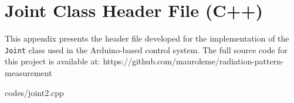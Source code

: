 \chapter{Joint Class Header File (C++)}
\label{apendice3}

This appendix presents the header file developed for the implementation of the
\texttt{Joint} class used in the Arduino-based control system. The full source code for this project is available at: https://github.com/mauroleme/radiation-pattern-measurement


{codes/joint2.cpp}
